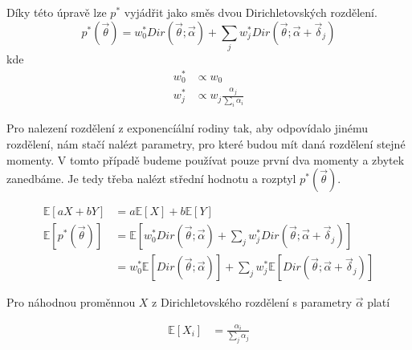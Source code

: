 Díky této úpravě lze $p^*$ vyjádřit jako směs dvou Dirichletovských rozdělení.
\begin{equation}
p^*(\vec{\theta}) =
    w_0^* Dir(\vec{\theta}; \vec{\alpha}) +
    \sum_j w^*_j
        Dir(\vec{\theta}; \vec{\alpha} + \vec{\delta}_j)
\end{equation}
kde 
\begin{align}
    w^*_0 &\propto w_0 \\
    w^*_j &\propto w_j \frac{\alpha_j}{\sum_i \alpha_i}
\end{align}

Pro nalezení rozdělení z exponencíální rodiny tak, aby odpovídalo jinému
rozdělení, nám stačí nalézt parametry, pro které budou mít daná rozdělení
stejné momenty. V tomto případě budeme používat pouze první dva momenty a
zbytek zanedbáme. Je tedy třeba nalézt střední hodnotu a rozptyl
$p^*(\vec\theta)$.

\begin{align}
\mathbb{E}[aX+bY] &= a\mathbb{E}[X] + b\mathbb{E}[Y]
\\
\mathbb{E}[p^*(\vec{\theta})] &= \mathbb{E}
    \left[
        w_0^* Dir(\vec{\theta}; \vec{\alpha}) +
        \sum_j w^*_j
            Dir(\vec{\theta}; \vec{\alpha} + \vec{\delta}_j)
    \right] 
\\
&= w_0^* \mathbb{E}[Dir(\vec\theta; \vec\alpha)] +
    \sum_j w_j^* \mathbb{E}[Dir(\vec\theta; \vec\alpha + \vec{\delta}_j)]
\end{align}

Pro náhodnou proměnnou $X$ z Dirichletovského rozdělení s parametry
$\vec\alpha$ platí

\begin{align}
    \mathbb{E}[X_i] &= \frac{\alpha_i}{\sum_j \alpha_j}
\end{align}
